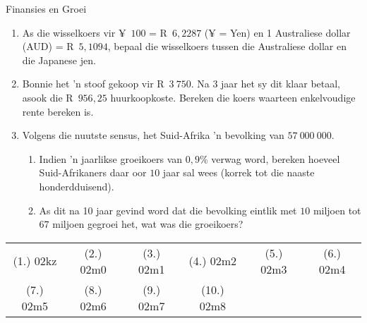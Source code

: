 \begin{eocexercises}{Finansies en Groei}
\begin{enumerate}[label=\textbf{\arabic*}.]
	\item As die wisselkoers vir ¥~$100$ = R~$6,2287$ (¥ = Yen) en 1 Australiese dollar (AUD) = R~$5,1094$, bepaal die wisselkoers
tussen die Australiese dollar en die Japanese jen.
	\item Bonnie het ’n stoof gekoop vir R~$3~750$. Na 3 jaar het sy dit klaar betaal, asook die R~$956,25$ huurkoopkoste.
Bereken die koers waarteen enkelvoudige rente bereken is.
	\item Volgens die nuutste sensus, het Suid-Afrika 'n bevolking van $57~000~000$.
	\begin{enumerate}[noitemsep, label=\textbf{(\alph*)} ]
	    \item Indien 'n jaarlikse groeikoers van $0,9\%$ verwag word, bereken hoeveel Suid-Afrikaners daar oor $10$ jaar sal wees (korrek tot die naaste honderdduisend).

	    \item As dit na 10 jaar gevind word dat die bevolking eintlik met $10$ miljoen tot $67$ miljoen gegroei het, wat was die groeikoers?
	\end{enumerate}

    \end{enumerate}

\par \practiceinfo
\par \begin{tabular}[h]{cccccc}
(1.)	02kz	&
(2.)	02m0	&
(3.)	02m1	&
(4.)	02m2	&
(5.)	02m3	&
(6.)	02m4	\\ %
(7.)	02m5	&
(8.)	02m6	&
(9.)	02m7	&
(10.)	02m8	&
\end{tabular}
\end{eocexercises}
